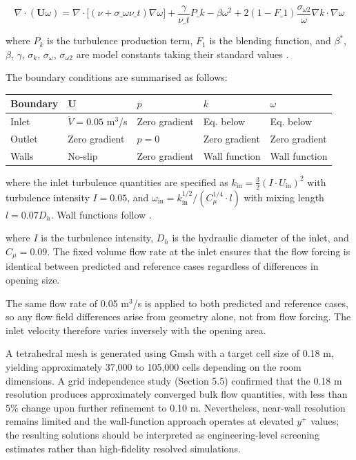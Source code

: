 \documentclass[preprint,12pt,number]{elsarticle}
\begin{document}
\begin{equation}
\nabla \cdot (\mathbf{U} \omega) = \nabla \cdot \bigl[(\nu + \sigma\_\omega \nu\_t) \nabla \omega\bigr] + \frac{\gamma}{\nu\_t} P\_k - \beta \omega^2 + 2(1 - F\_1) \frac{\sigma_{\omega 2}}{\omega} \nabla k \cdot \nabla \omega
\label{eq:omega-transport}
\end{equation}

where $P_k$ is the turbulence production term, $F_1$ is the blending function, and $\beta^*$, $\beta$, $\gamma$, $\sigma_k$, $\sigma_\omega$, $\sigma_{\omega 2}$ are model constants taking their standard values \cite{menter1994TwoequationEddyviscosity}.

The boundary conditions are summarised as follows:

\begin{tabular}{lllll}
\toprule
Boundary & $\mathbf{U}$ & $p$ & $k$ & $\omega$ \\
\midrule
Inlet & $\dot{V} = 0.05$ m$^3$/s & Zero gradient & Eq. below & Eq. below \\
Outlet & Zero gradient & $p = 0$ & Zero gradient & Zero gradient \\
Walls & No-slip & Zero gradient & Wall function & Wall function \\
\bottomrule
\end{tabular}


where the inlet turbulence quantities are specified as $k_\text{in} = \frac{3}{2}(I \cdot U_\text{in})^2$ with turbulence intensity $I = 0.05$, and $\omega_\text{in} = k_\text{in}^{1/2} / (C_\mu^{1/4} \cdot l)$ with mixing length $l = 0.07 D_h$. Wall functions follow \cite{launder.spalding1974NumericalComputation}.

where $I$ is the turbulence intensity, $D_h$ is the hydraulic diameter of the inlet, and $C_\mu = 0.09$. The fixed volume flow rate at the inlet ensures that the flow forcing is identical between predicted and reference cases regardless of differences in opening size.

The same flow rate of 0.05 m$^3$/s is applied to both predicted and reference cases, so any flow field differences arise from geometry alone, not from flow forcing. The inlet velocity therefore varies inversely with the opening area.

A tetrahedral mesh is generated using Gmsh \cite{geuzaine.remacle2009Gmsh3D} with a target cell size of 0.18 m, yielding approximately 37,000 to 105,000 cells depending on the room dimensions. A grid independence study (Section 5.5) confirmed that the 0.18 m resolution produces approximately converged bulk flow quantities, with less than 5\% change upon further refinement to 0.10 m. Nevertheless, near-wall resolution remains limited and the wall-function approach operates at elevated $y^+$ values; the resulting solutions should be interpreted as engineering-level screening estimates rather than high-fidelity resolved simulations.
\end{document}
